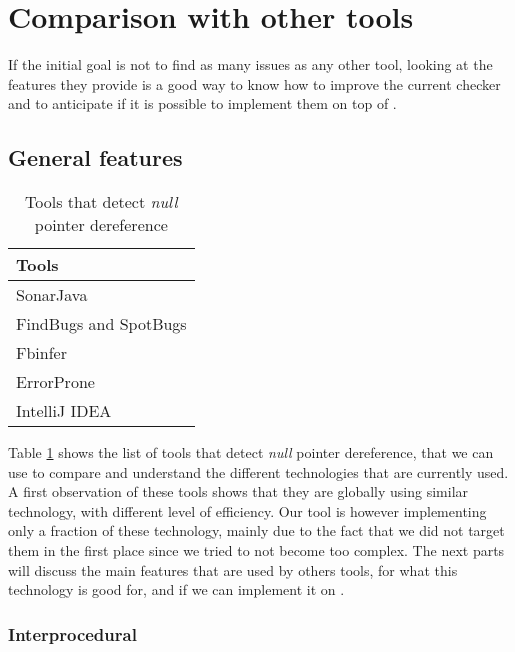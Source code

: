 \section{Comparison with other tools}
\label{sec:comparison}

If the initial goal is not to find as many issues as any other tool, looking at the features they provide is a good way to know how to improve the current checker and to anticipate if it is possible to implement them on top of \slang{}.


\subsection{General features}
\label{subsec:general_features}

\begin{table}[h]
	\centering
	\caption{Tools that detect \emph{null} pointer dereference}
	\label{table:tools_features}
	\begin{tabular}{|l|}
		\hline
		\bf Tools \\
		\hline
		SonarJava \cite{SonarJava:2019:Online} \\
		FindBugs \cite{Hovemeyer:2004:FBE:1052883.1052895} and SpotBugs \cite{spotBugs:2019:Online} \\
		Fbinfer \cite{fbInfer:2019:Online} \\
		ErrorProne \cite{errorProne:2019:Online} \\
		IntelliJ IDEA \cite{intelJIDEA:2019:Online} \\
		\hline    
	\end{tabular}
\end{table}

Table \ref{table:tools_features} shows the list of tools that detect \emph{null} pointer dereference, that we can use to compare and understand the different technologies that are currently used.
A first observation of these tools shows that they are globally using similar technology, with different level of efficiency.
Our tool is however implementing only a fraction of these technology, mainly due to the fact that we did not target them in the first place since we tried to not become too complex. 
The next parts will discuss the main features that are used by others tools, for what this technology is good for, and if we can implement it on \slang{}.

\subsubsection{Interprocedural}
\label{subsubsec:inter_procedrual}


